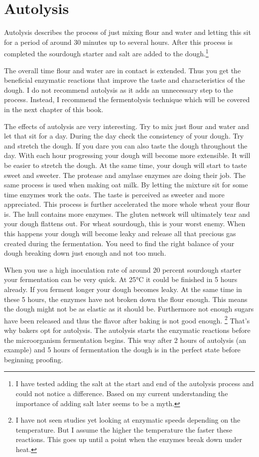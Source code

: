 \section{Autolysis}
\label{section:autolysis}

Autolysis describes the process of just mixing flour and water and letting
this sit for a period of around 30 minutes up to several hours. After this
process is completed the sourdough starter and salt are added to the
dough.\footnote{I have tested adding the salt at the start and end of the
autolysis process and could not notice a difference. Based on my current
understanding the importance of adding salt later seems to be a myth.}

The overall time flour and water are in contact is extended. Thus you get the
beneficial enzymatic reactions that improve the taste and characteristics of the
dough. I do not recommend autolysis as it adds an unnecessary step to the
process. Instead, I recommend the fermentolysis technique which will be covered in the
next chapter of this book.

The effects of autolysis are very interesting. Try to mix just flour and
water and let that sit for a day. During the day check the consistency of
your dough. Try and stretch the dough. If you dare you can also taste the
dough throughout the day. With each hour progressing your dough will become
more extensible. It will be easier to stretch the dough. At the same time, your
dough will start to taste sweet and sweeter. The protease and amylase enzymes
are doing their job. The same process is used when making oat milk. By letting
the mixture sit for some time enzymes work the oats. The taste is perceived as
sweeter and more appreciated. This process is further accelerated the more
whole wheat your flour is. The hull contains more enzymes. The gluten network
will ultimately tear and your dough flattens out. For wheat sourdough, this is
your worst enemy. When this happens your dough will become leaky and release
all that precious gas created during the fermentation. You need to find the
right balance of your dough breaking down just enough and not too much.

When you use a high inoculation rate of around 20 percent sourdough starter
your fermentation can be very quick. At 25°C it could be finished in 5 hours
already. If you ferment longer your dough becomes leaky. At the same time in
these 5 hours, the enzymes have not broken down the flour enough. This means
the dough might not be as elastic as it should be. Furthermore not enough
sugars have been released and thus the flavor after baking is not good enough.
\footnote{I have not seen studies yet looking at enzymatic speeds depending on
the temperature. But I assume the higher the temperature the faster these
reactions. This goes up until a point when the enzymes break down under
heat.} That's why bakers opt for autolysis. The autolysis starts the enzymatic
reactions before the microorganism fermentation begins. This way after 2 hours
of autolysis (an example) and 5 hours of fermentation the dough is in the
perfect state before beginning proofing.

